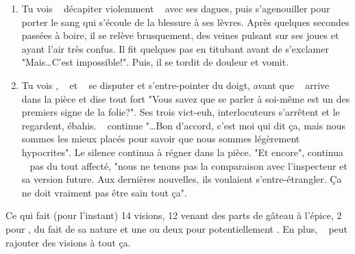 {\begin{enumerate}
		\item Tu vois \nmPlayerXII ~ décapiter violemment \nmPlayerVI ~ avec ses dagues, puis s'agenouiller pour porter le sang qui s'écoule de la blessure à ses lèvres. Après quelques secondes passées à boire, il se relève brusquement, des veines pulsant sur ses joues et ayant l'air très confus. Il fit quelques pas en titubant avant de s'exclamer "Mais\dots C'est impossible!". Puis, il se tordit de douleur et vomit.
		
		\item Tu vois \nmPlayerII, \nmPlayerI ~ et \nmPlayerIII ~ se disputer et s'entre-pointer du doigt, avant que \nmPlayerIV ~ arrive dans la pièce et dise tout fort "Vous savez que se parler à soi-même est un des premiers signe de la folie?". Ses trois vict-euh, interlocuteurs s'arrêtent et le regardent, ébahis. \nmPlayerIV ~ continue "\dots Bon d'accord, c'est moi qui dit ça, mais nous sommes les mieux placés pour savoir que nous sommes légèrement hypocrites". Le silence continua à régner dans la pièce. "Et encore", continua \nmPlayerIV ~ pas du tout affecté, "nous ne tenons pas la comparaison avec l'inspecteur et sa version future. Aux dernières nouvelles, ils voulaient s'entre-étrangler. Ça ne doit vraiment pas être sain tout ça".
	\end{enumerate}
	
	Ce qui fait (pour l'instant) 14 visions, 12 venant des parts de gâteau à l'épice, 2 pour \nmPlayerIX, du fait de sa nature et une ou deux pour potentiellement \nmPlayerVI. En plus, \nmPlayerIX ~ peut rajouter des visions à tout ça.
}








